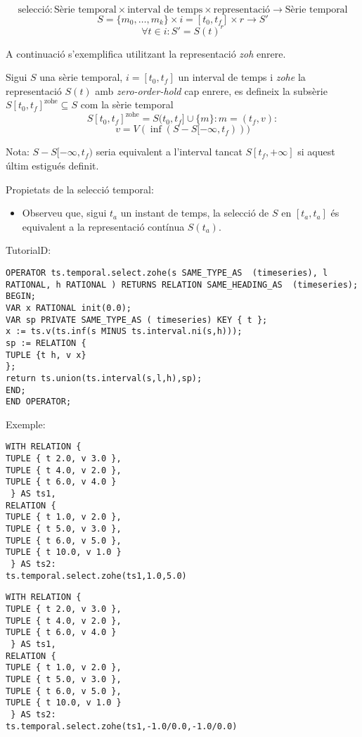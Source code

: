 \begin{definition}
  \[
  \text{selecció}: \text{Sèrie temporal} \times \text{interval de
    temps} \times \text{representació} \longrightarrow \text{Sèrie
    temporal}
  \]
  \[
  S = \{m_0 , \ldots , m_k\}  \times i = [t_0,t_f] \times r \longrightarrow S'
  \]
  \[
  \forall  t \in i: S' = S(t)^r 
  \] 
\end{definition}

A continuació s'exemplifica utilitzant la representació \emph{zoh} enrere.


\begin{definition}
  Sigui $S$ una sèrie temporal, $i=[t_0,t_f]$ un interval de temps i
  \emph{zohe} la representació $S(t)$ amb \emph{zero-order-hold} cap
  enrere, es defineix la subsèrie $S[t_0,t_f]^{\text{zohe}}\subseteq
  S$ com la sèrie temporal 
  \[
  S[t_0,t_f]^{\text{zohe}} = S(t_0,t_f] \cup \{m\} : m=(t_f,v):
  \]
  \[
  v=  V(\inf(S-S[-\infty,t_f)))
  \]

  
  Nota: $S-S[-\infty,t_f)$ seria equivalent a l'interval tancat
  $S[t_f,+\infty]$ si aquest últim estigués definit.
\end{definition}

Propietats de la selecció temporal:

\begin{itemize}
\item Observeu que, sigui $t_a$ un instant de temps, la selecció de $S$ en $[t_a,t_a]$ és equivalent a la representació contínua $S(t_a)$. 
\end{itemize}



TutorialD:
\begin{verbatim}
OPERATOR ts.temporal.select.zohe(s SAME_TYPE_AS  (timeseries), l RATIONAL, h RATIONAL ) RETURNS RELATION SAME_HEADING_AS  (timeseries);
BEGIN;
VAR x RATIONAL init(0.0);
VAR sp PRIVATE SAME_TYPE_AS ( timeseries) KEY { t };
x := ts.v(ts.inf(s MINUS ts.interval.ni(s,h)));
sp := RELATION {
TUPLE {t h, v x}
};
return ts.union(ts.interval(s,l,h),sp);
END;
END OPERATOR;
\end{verbatim}

Exemple:
\begin{verbatim}
WITH RELATION {
TUPLE { t 2.0, v 3.0 },
TUPLE { t 4.0, v 2.0 },
TUPLE { t 6.0, v 4.0 }
 } AS ts1,
RELATION {
TUPLE { t 1.0, v 2.0 },
TUPLE { t 5.0, v 3.0 },
TUPLE { t 6.0, v 5.0 },
TUPLE { t 10.0, v 1.0 }
 } AS ts2:
ts.temporal.select.zohe(ts1,1.0,5.0)
\end{verbatim}
\begin{verbatim}
WITH RELATION {
TUPLE { t 2.0, v 3.0 },
TUPLE { t 4.0, v 2.0 },
TUPLE { t 6.0, v 4.0 }
 } AS ts1,
RELATION {
TUPLE { t 1.0, v 2.0 },
TUPLE { t 5.0, v 3.0 },
TUPLE { t 6.0, v 5.0 },
TUPLE { t 10.0, v 1.0 }
 } AS ts2:
ts.temporal.select.zohe(ts1,-1.0/0.0,-1.0/0.0)
\end{verbatim}




